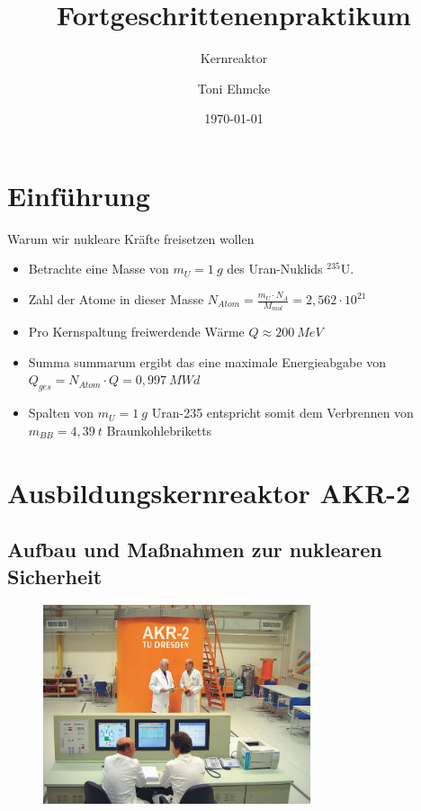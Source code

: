 \documentclass[10pt]{beamer}
\title{Fortgeschrittenenpraktikum}
\subtitle{Kernreaktor}
\author{Toni Ehmcke}
\institute{TU Dresden}
\date{\today}
\begin{document}
\maketitle

\section{Einführung}
	\begin{frame}{Warum wir nukleare Kräfte freisetzen wollen}
		\begin{itemize}
		\item<1-> Betrachte eine Masse von $m_U = 1\ \unit{g}$ des Uran-Nuklids $^{235}$U.\\
		\item<2-> Zahl der Atome in dieser Masse $N_{Atom} = \frac{m_U\cdot N_A}{M_{mol}} = 2,562 \cdot 10^{21}$
		\item<3-> Pro Kernspaltung freiwerdende Wärme $Q \approx 200\ \unit{MeV}$
		\item<4-> Summa summarum ergibt das eine maximale Energieabgabe von $Q_{ges}=N_{Atom}\cdot Q = 0,997\ \unit{MWd}$ 
		\item<5-> Spalten von $m_U = 1\ \unit{g}$ Uran-235 entspricht somit dem Verbrennen von $m_{BB} =4,39\ \unit{t}$ Braunkohlebriketts 
		\end{itemize}
	\end{frame}

\section{Ausbildungskernreaktor AKR-2} 
	\subsection{Aufbau und Maßnahmen zur nuklearen Sicherheit}
	\begin{frame}{}
			\begin{figure}[ht]
				\centering
				\includegraphics[width=0.7\textwidth]{pic/akr2.png}\\
			\end{figure}	
	\end{frame}
\end{document}
